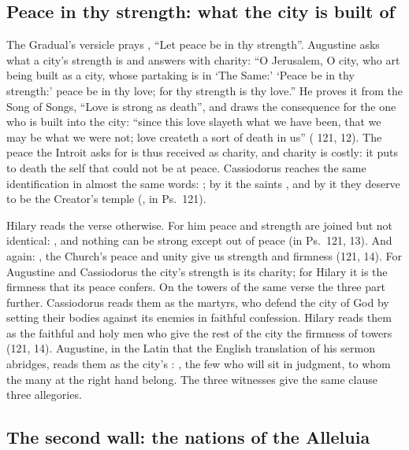 \subsection{Peace in thy strength: what the city is built of}

The Gradual's versicle prays , ``Let peace be in
thy strength''. Augustine asks what a city's strength is and answers with
charity: ``O Jerusalem, O city, who art being built as a city, whose partaking
is in `The Same:' `Peace be in thy strength:' peace be in thy love; for thy
strength is thy love.'' He proves it from the Song of Songs, ``Love is strong
as death'', and draws the consequence for the one who is built into the city:
``since this love slayeth what we have been, that we may be what we were not;
love createth a sort of death in us'' ( 121, 12).
The peace the Introit asks for is thus received as charity, and charity is
costly: it puts to death the self that could not be at peace. Cassiodorus
reaches the same identification in almost the same words: ; by it the
saints , and by it they deserve to be the Creator's temple
(, in Ps.~121).

Hilary reads the verse otherwise. For him
peace and strength are joined but not identical: , and nothing can be strong except out of peace (in
Ps.~121, 13). And again: , the Church's peace and unity give us strength and
firmness (121, 14). For Augustine and Cassiodorus the city's strength is its charity; for Hilary it is
the firmness that its peace confers. On the towers of the same verse the three
part further. Cassiodorus reads them as the martyrs, who defend the city of God
by setting their bodies against its enemies in faithful confession. Hilary
reads them as the faithful and holy men who give the rest of the city the
firmness of towers (121, 14). Augustine, in the Latin that the English
translation of his sermon abridges, reads them as the city's :
, the few who will sit in judgment, to whom the many
at the right hand belong. The three witnesses give the same clause three
allegories.

\subsection{The second wall: the nations of the Alleluia}


